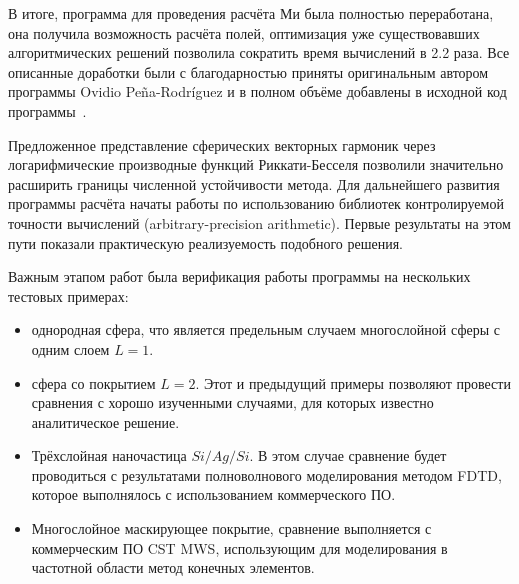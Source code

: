 В итоге, программа для проведения расчёта Ми была полностью
переработана, она получила возможность расчёта полей, оптимизация уже
существовавших алгоритмических решений позволила сократить время
вычислений в 2.2 раза.  Все описанные доработки были с благодарностью
приняты оригинальным автором программы Ovidio Pe\~{n}a-Rodr\'{i}guez и
в полном объёме добавлены в исходной код
программы~\cite{Scattnlay-web}.

Предложенное представление сферических векторных гармоник через
логарифмические производные функций Риккати-Бесселя позволили
значительно расширить границы численной устойчивости метода.  Для
дальнейшего развития программы расчёта начаты работы по использованию
библиотек контролируемой точности вычислений (arbitrary-precision
arithmetic).  Первые результаты на этом пути показали практическую
реализуемость подобного решения. 


Важным этапом работ была верификация работы программы на нескольких
тестовых примерах:
\begin{itemize}
\item однородная сфера, что является предельным случаем многослойной
  сферы с одним слоем $L=1$.
\item сфера со покрытием $L=2$. Этот и предыдущий примеры позволяют
  провести сравнения с хорошо изученными случаями, для которых
  известно аналитическое решение.
\item Трёхслойная наночастица $Si/Ag/Si$. В этом случае сравнение
  будет проводиться с результатами полноволнового моделирования
  методом FDTD,  которое выполнялось с использованием  коммерческого ПО.
\item Многослойное маскирующее покрытие, сравнение выполняется с
  коммерческим ПО CST MWS, использующим для моделирования в частотной
  области метод конечных элементов.
\end{itemize}


